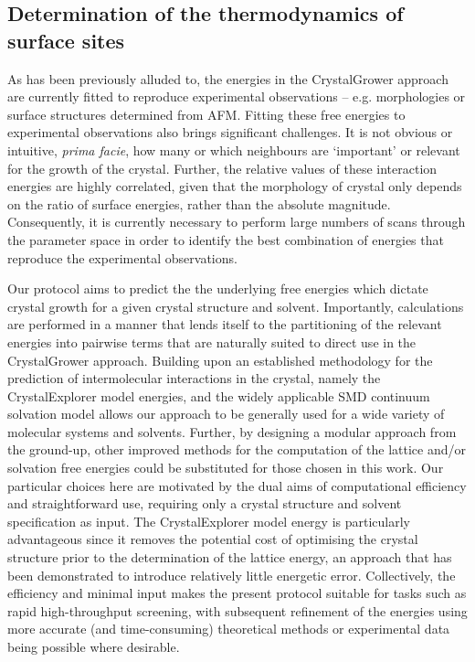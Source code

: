 \documentclass[twoside,twocolumn,9pt]{article}
\begin{document}
\subsection{Determination of the thermodynamics of surface sites}
As has been previously alluded to, the energies in the CrystalGrower approach are currently fitted to reproduce experimental observations – e.g. morphologies or surface structures determined from AFM. 
Fitting these free energies to experimental observations also brings significant challenges. It is not obvious or intuitive, \textit{prima facie}, how many or which neighbours are `important' or relevant for the growth of the crystal. Further, the relative values of these interaction energies are highly correlated, given that the morphology of crystal only depends on the ratio of surface energies, rather than the absolute magnitude. Consequently, it is currently necessary to perform large numbers of scans through the parameter space in order to identify the best combination of energies that reproduce the experimental observations.

Our protocol aims to predict the the underlying free energies which dictate crystal growth for a given crystal structure and solvent. Importantly, calculations are performed in a manner that lends itself to the partitioning of the relevant energies into pairwise terms that are naturally suited to direct use in the CrystalGrower approach. Building upon an established methodology for the prediction of intermolecular interactions in the crystal, namely the CrystalExplorer\cite{Mackenzie2017,Spackman2021} model energies, and the widely applicable SMD continuum solvation model\cite{Marenich2009} allows our approach to be generally used for a wide variety of molecular systems and solvents. Further, by designing a modular approach from the ground-up, other improved methods for the computation of the lattice and/or solvation free energies could be substituted for those chosen in this work. Our particular choices here are motivated by the dual aims of computational efficiency and straightforward use, requiring only a crystal structure and solvent specification as input. The CrystalExplorer model energy is particularly advantageous since it removes the potential cost of optimising the crystal structure prior to the determination of the lattice energy, an approach that has been demonstrated to introduce relatively little energetic error.\cite{Thomas2018}
Collectively, the efficiency and minimal input makes the present protocol suitable for tasks such as rapid high-throughput screening, with subsequent refinement of the energies using more accurate 
(and time-consuming) theoretical methods or experimental data being possible where desirable.
\end{document}
